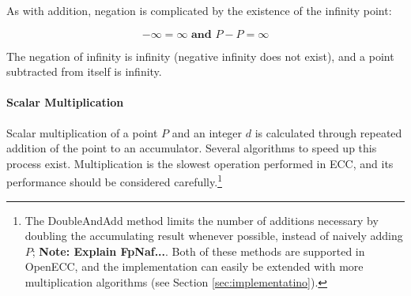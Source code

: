As with addition, negation is complicated by the existence of the infinity point:

\begin{equation}
	-\infty = \infty \textbf{ and } P - P = \infty
\end{equation}

The negation of infinity is infinity (negative infinity does not exist), and a point subtracted from itself is infinity.\cite{hankerson2010}

\paragraph{Scalar Multiplication}

Scalar multiplication of a point \(P\) and an integer \(d\) is calculated through repeated addition of the point to an accumulator.
Several algorithms to speed up this process exist. Multiplication is the slowest operation performed in ECC, and its performance should
be considered carefully.\footnote{The DoubleAndAdd method limits the number of additions necessary by doubling the accumulating result
whenever possible, instead of naively adding \(P\); \textbf{Note: Explain FpNaf...}. Both of these methods are supported in OpenECC, and
the implementation can easily be extended with more multiplication algorithms (see Section \ref{sec:implementatino}).}